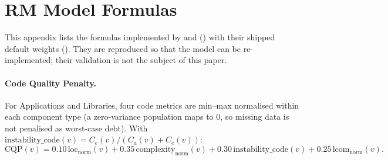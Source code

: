 \section{RM Model Formulas}
\label{app:formulas}

This appendix lists the formulas implemented by  and  () with their shipped default weights (). They are reproduced so that the model can be re-implemented; their validation is not the subject of this paper.

\paragraph{Code Quality Penalty.} For Applications and Libraries, four code metrics are min--max normalised within each component type (a zero-variance population maps to 0, so missing data is not penalised as worst-case debt). With $\text{instability\_code}(v) = C_e(v)/(C_a(v)+C_e(v))$:
\begin{equation}
\mathrm{CQP}(v) = 0.10\,\text{loc}_{\text{norm}}(v) + 0.35\,\text{complexity}_{\text{norm}}(v) + 0.30\,\text{instability\_code}(v) + 0.25\,\text{lcom}_{\text{norm}}(v).
\end{equation}

